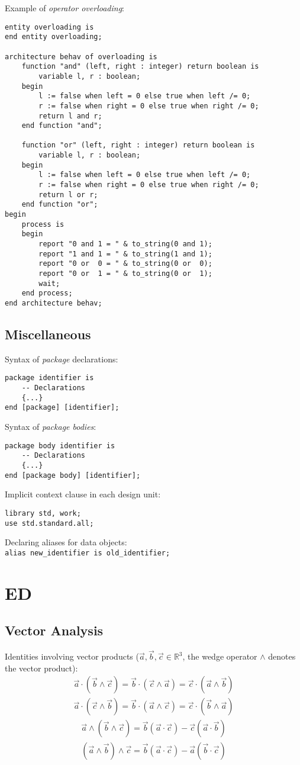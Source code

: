 \documentclass[fontsize=11pt,a4paper]{scrartcl}
\begin{document}
Example of \emph{operator overloading}:
\begin{lstlisting}
entity overloading is
end entity overloading;

architecture behav of overloading is
	function "and" (left, right : integer) return boolean is
		variable l, r : boolean;
	begin
		l := false when left = 0 else true when left /= 0;
		r := false when right = 0 else true when right /= 0;
		return l and r;
	end function "and";

	function "or" (left, right : integer) return boolean is
		variable l, r : boolean;
	begin
		l := false when left = 0 else true when left /= 0;
		r := false when right = 0 else true when right /= 0;
		return l or r;
	end function "or";
begin
	process is
	begin
		report "0 and 1 = " & to_string(0 and 1);
		report "1 and 1 = " & to_string(1 and 1);
		report "0 or  0 = " & to_string(0 or  0);
		report "0 or  1 = " & to_string(0 or  1);
		wait;
	end process;
end architecture behav;
\end{lstlisting}
%
%
%
%
\subsection{Miscellaneous}
Syntax of \emph{package} declarations:
\begin{lstlisting}
package identifier is
	-- Declarations
	{...}
end [package] [identifier];
\end{lstlisting}

Syntax of \emph{package bodies}:
\begin{lstlisting}
package body identifier is
	-- Declarations
	{...}
end [package body] [identifier];
\end{lstlisting}

Implicit context clause in each design unit:
\begin{lstlisting}
library std, work;
use std.standard.all;
\end{lstlisting}

Declaring aliases for data objects:\\ \lstinline!alias new_identifier is old_identifier;!
%
%
%
%
%
\section{ED}
\subsection{Vector Analysis}
Identities involving vector products ($\vec a, \vec b, \vec c\in\mathbb{R}^3$, the wedge operator $\wedge$ denotes the vector product):
\begin{gather*}
	\vec a\cdot(\vec b\wedge\vec c) = \vec b\cdot(\vec c\wedge\vec a) = \vec c\cdot(\vec a\wedge\vec b)\\
	\vec a\cdot(\vec c\wedge\vec b) = \vec b\cdot(\vec a\wedge\vec c) = \vec c\cdot(\vec b\wedge\vec a)
\end{gather*}
\begin{gather*}
	\vec a\wedge(\vec b\wedge\vec c) = \vec b(\vec a\cdot\vec c) - \vec c(\vec a\cdot\vec b)\\
	(\vec a\wedge\vec b)\wedge\vec c = \vec b(\vec a\cdot\vec c) - \vec a(\vec b\cdot\vec c)
\end{gather*}
\end{document}

